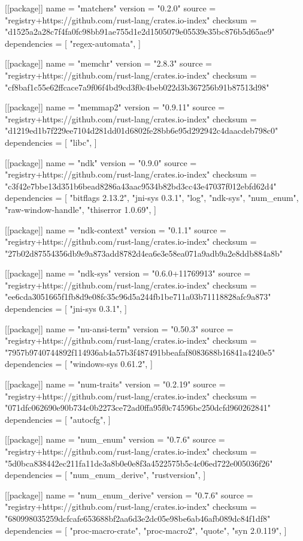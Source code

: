 [[package]]
name = "matchers"
version = "0.2.0"
source = "registry+https://github.com/rust-lang/crates.io-index"
checksum = "d1525a2a28c7f4fa0fc98bb91ae755d1e2d1505079e05539e35bc876b5d65ae9"
dependencies = [
 "regex-automata",
]

[[package]]
name = "memchr"
version = "2.8.3"
source = "registry+https://github.com/rust-lang/crates.io-index"
checksum = "cf8baf1c55e62ffcace7a9f06f4bd9cd3f0c4beb022d3b367256b91b87513d98"

[[package]]
name = "memmap2"
version = "0.9.11"
source = "registry+https://github.com/rust-lang/crates.io-index"
checksum = "d1219ed1b7f229ee7104d281dd01d6802fe28bb6e95d292942c4daacdeb798c0"
dependencies = [
 "libc",
]

[[package]]
name = "ndk"
version = "0.9.0"
source = "registry+https://github.com/rust-lang/crates.io-index"
checksum = "c3f42e7bbe13d351b6bead8286a43aac9534b82bd3cc43e47037f012ebfd62d4"
dependencies = [
 "bitflags 2.13.2",
 "jni-sys 0.3.1",
 "log",
 "ndk-sys",
 "num_enum",
 "raw-window-handle",
 "thiserror 1.0.69",
]

[[package]]
name = "ndk-context"
version = "0.1.1"
source = "registry+https://github.com/rust-lang/crates.io-index"
checksum = "27b02d87554356db9e9a873add8782d4ea6e3e58ea071a9adb9a2e8ddb884a8b"

[[package]]
name = "ndk-sys"
version = "0.6.0+11769913"
source = "registry+https://github.com/rust-lang/crates.io-index"
checksum = "ee6cda3051665f1fb8d9e08fc35c96d5a244fb1be711a03b71118828afc9a873"
dependencies = [
 "jni-sys 0.3.1",
]

[[package]]
name = "nu-ansi-term"
version = "0.50.3"
source = "registry+https://github.com/rust-lang/crates.io-index"
checksum = "7957b9740744892f114936ab4a57b3f487491bbeafaf8083688b16841a4240e5"
dependencies = [
 "windows-sys 0.61.2",
]

[[package]]
name = "num-traits"
version = "0.2.19"
source = "registry+https://github.com/rust-lang/crates.io-index"
checksum = "071dfc062690e90b734c0b2273ce72ad0ffa95f0c74596bc250dcfd960262841"
dependencies = [
 "autocfg",
]

[[package]]
name = "num_enum"
version = "0.7.6"
source = "registry+https://github.com/rust-lang/crates.io-index"
checksum = "5d0bca838442ec211fa11de3a8b0e0e8f3a4522575b5c4c06ed722e005036f26"
dependencies = [
 "num_enum_derive",
 "rustversion",
]

[[package]]
name = "num_enum_derive"
version = "0.7.6"
source = "registry+https://github.com/rust-lang/crates.io-index"
checksum = "680998035259dcfcafe653688bf2aa6d3e2dc05e98be6ab46afb089dc84f1df8"
dependencies = [
 "proc-macro-crate",
 "proc-macro2",
 "quote",
 "syn 2.0.119",
]

